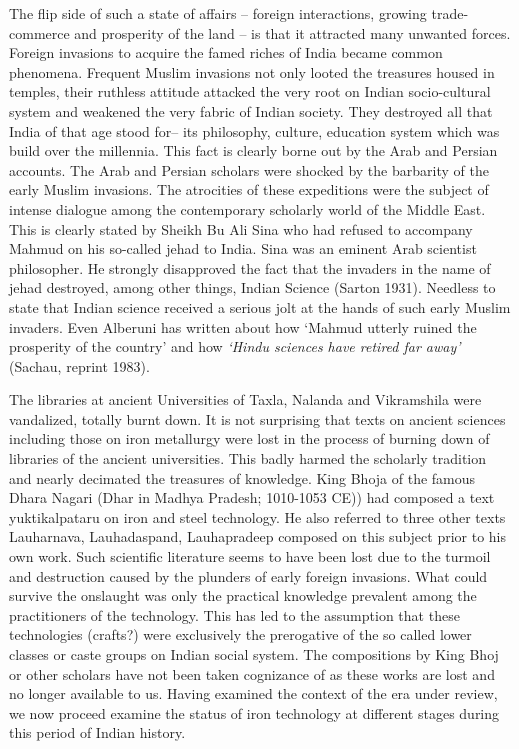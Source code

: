 The flip side of such a state of affairs – foreign interactions, growing trade-commerce and prosperity of the land – is that it attracted many unwanted forces. Foreign invasions to acquire the famed riches of India became common phenomena. Frequent Muslim invasions not only looted the treasures housed in temples, their ruthless attitude attacked the very root on Indian socio-cultural system and weakened the very fabric of Indian society. They destroyed all that India of that age stood for– its philosophy, culture, education system which was build over the millennia. This fact is clearly borne out by the Arab and Persian accounts. The Arab and Persian scholars were shocked by the barbarity of the early Muslim invasions. The atrocities of these expeditions were the subject of intense dialogue among the contemporary scholarly world of the Middle East. This is clearly stated by Sheikh Bu Ali Sina who had refused to accompany Mahmud on his so-called jehad to India. Sina was an eminent Arab scientist philosopher. He strongly disapproved the fact that the invaders in the name of jehad  destroyed, among other things, Indian Science (Sarton 1931). Needless to state that Indian science received a serious jolt at the hands of such early Muslim invaders. Even Alberuni has written about how `Mahmud utterly ruined the prosperity of the country' and how {\it `Hindu sciences have retired far away'} (Sachau, reprint 1983). 

The libraries at ancient Universities of Taxla, Nalanda and Vikramshila were vandalized, totally burnt down. It is not surprising that texts on ancient sciences including those on iron metallurgy were lost in the process of burning down of libraries of the ancient universities. This badly harmed the scholarly tradition and nearly decimated the treasures of knowledge. King Bhoja of the famous Dhara Nagari (Dhar in Madhya Pradesh; 1010-1053 CE)) had composed a text yuktikalpataru on iron and steel technology. He also referred to three other texts Lauharnava, Lauhadaspand, Lauhapradeep composed on this subject prior to his own work. Such scientific literature seems to have been lost due to the turmoil and destruction caused by the plunders of early foreign invasions. What could survive the onslaught was only the practical knowledge prevalent among the practitioners of the technology. This has led to the assumption that these technologies (crafts?) were exclusively the prerogative of the so called lower classes or caste groups on Indian social system. The compositions by King Bhoj or other scholars have not been taken cognizance of as these works are lost and no longer available to us. Having examined the context of the era under review, we now proceed examine the status of iron technology at different stages during this period of Indian history.

